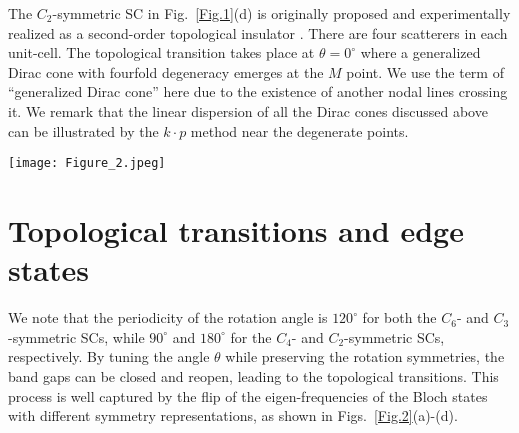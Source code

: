 \documentclass[doublecol]{epl2}
\begin{document}
The $C_2$-symmetric SC in Fig.~\ref{Fig.1}(d) is originally proposed and experimentally realized as a second-order topological insulator \cite{zhang2019second}. 
There are four scatterers in each unit-cell. The topological transition takes place at $\theta=0^\circ$ where a generalized Dirac cone with fourfold degeneracy emerges at the $M$ point. We use the term of ``generalized Dirac cone'' here due to the existence of another nodal lines crossing it. We remark that the linear dispersion of all the Dirac cones discussed above can be illustrated by the $k\cdot p$ method near the degenerate points\cite{mei2012first}.


\begin{figure*}[t]\centering\texttt{[image: Figure\_2.jpeg]}
\caption{Schematic of the topological phase transitions of bulk states and the emergent gapped edge states. (a)-(d) The topological phase diagrams of bulk states for the SCs in Figs.~\ref{Fig.1}(a)-(d). The frequencies of the concerned states with different symmetry representations versus the rotation angle are plotted as the red dashed and green solid curves, respectively. Separately, the symmetry representations are  $E_1$ and $E_2$ in (a), $^2E$ and $^1E$ in (b), $E$ and $B$ in (c) and $B$ and $A$ in (d), as labelled on the top of each Figure. The labels of the representations are based on the character tables on the Bilbao Crystallographic Server \cite{timmurphy.org}. Insets illustrate the location of real-space Wannier centers of the lower-frequency Bloch bands below the opened band gap. The red dots denote the Wyckoff positions. (e)-(h) The corresponding projected band structures along the wavevectors calculated from the ribbon-shaped structures as sketched on the top of each Figure. The domain walls in one direction are between two topologically distinct phases with specific rotation angles. The periodic boundary condition remains in the other direction. The orange curves denote the gapped edge states whose wave functions localize at the domain walls. The blue regions represent the frequency ranges of the edge band gaps. Insets schematically illustrate the Wannier centers around the domain-wall boundaries.}
\label{Fig.2}
\end{figure*}


\section{Topological transitions and edge states}
We note that the periodicity of the rotation angle is $120^\circ$ for both the $C_6$- and $C_3$-symmetric SCs, while $90^\circ$ and $180^\circ$ for the $C_4$- and $C_2$-symmetric SCs, respectively. By tuning the angle $\theta$ while preserving the rotation symmetries, the band gaps can be closed and reopen, leading to the topological transitions. This process is well captured by the flip of the eigen-frequencies of the Bloch states with different symmetry representations, as shown in Figs.~\ref{Fig.2}(a)-(d).  
\end{document}
